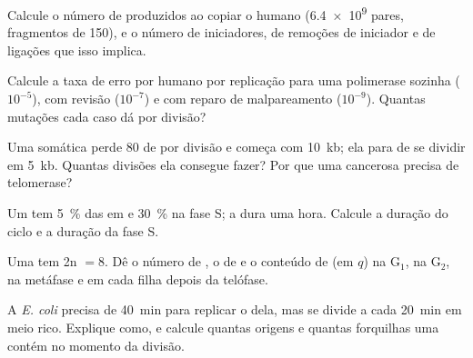 \begin{exercise}[$\star\star$]\label{exo:b1:replication-mitosis:5}
Calcule o número de  produzidos ao copiar o 
humano (\num{6.4e9} pares, fragmentos de \qty{150}{}), e o número de
iniciadores, de remoções de iniciador e de ligações que isso implica.
\end{exercise}

\begin{exercise}[$\star\star$]\label{exo:b1:replication-mitosis:6}
Calcule a taxa de erro por  humano por replicação para uma
polimerase sozinha ($10^{-5}$), com revisão ($10^{-7}$) e com reparo de
malpareamento ($10^{-9}$). Quantas mutações cada caso dá por divisão?
\end{exercise}

\begin{exercise}[$\star\star$]\label{exo:b1:replication-mitosis:7}
Uma  somática perde \qty{80}{}  de  por
divisão e começa com \qty{10}{kb}; ela para de se dividir em
\qty{5}{kb}. Quantas divisões ela consegue fazer? Por que uma 
cancerosa precisa de telomerase?
\end{exercise}

\begin{exercise}[$\star\star$]\label{exo:b1:replication-mitosis:8}
Um  tem \qty{5}{\%} das  em  e \qty{30}{\%} na fase
S; a  dura uma hora. Calcule a duração do ciclo e a duração da
fase S.
\end{exercise}

\begin{exercise}[$\star\star$]\label{exo:b1:replication-mitosis:9}
Uma  tem 2n $= 8$. Dê o número de , o de  e o
conteúdo de  (em $q$) na G$_1$, na G$_2$, na metáfase e em cada filha
depois da telófase.
\end{exercise}

\begin{exercise}[$\star\star\star$]\label{exo:b1:replication-mitosis:10}
A \emph{E. coli} precisa de \qty{40}{min} para replicar o 
dela, mas se divide a cada \qty{20}{min} em meio rico. Explique como, e
calcule quantas origens e quantas forquilhas uma  contém no
momento da divisão.
\end{exercise}

